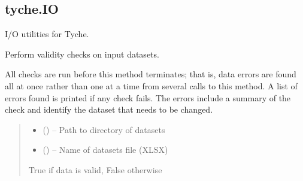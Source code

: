 \documentclass[letterpaper,10pt,english]{sphinxmanual}
\begin{document}
\subsection{tyche.IO}
\label{\detokenize{tyche:module-tyche.IO}}\label{\detokenize{tyche:tyche-io}}
\sphinxAtStartPar
I/O utilities for Tyche.

\begin{fulllineitems}
\label{\detokenize{tyche:tyche.IO.check_tables}}
\pysigstartsignatures
{}
\pysigstopsignatures
\sphinxAtStartPar
Perform validity checks on input datasets.

\sphinxAtStartPar
All checks are run before this method terminates; that is, data errors are found
all at once rather than one at a time from several calls to this method. A list of
errors found is printed if any check fails. The errors include a summary of the check
and identify the dataset that needs to be changed.
\begin{quote}\begin{description}
\begin{itemize}
\item {} 
\sphinxAtStartPar
{} () – Path to directory of datasets

\item {} 
\sphinxAtStartPar
{} () – Name of datasets file (XLSX)

\end{itemize}

\sphinxAtStartPar
{}

\sphinxAtStartPar
True if data is valid, False otherwise

\end{description}\end{quote}

\end{fulllineitems}
\end{document}
